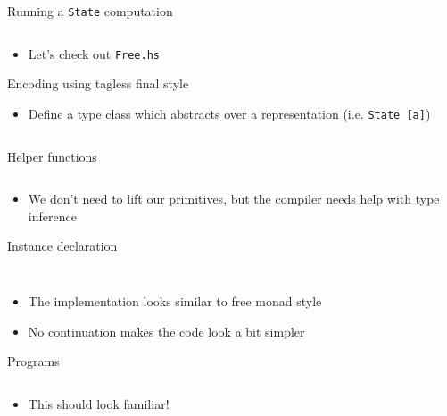 \documentclass[hyperref={pdfpagelabels=false},12pt]{beamer}
\newcommand{\code}[2]{\texttt{#2}}
\newcommand{\haskell}[1]{\code{haskell}{#1}}
\newcommand{\bash}[1]{\code{bash}{#1}}
\newcommand{\pygmentLines}[5]{\inputminted[bgcolor=lightgray,linenos,fontsize=#1,firstline=#2,lastline=#3,autogobble]{#4}{#5}}
\begin{document}
\begin{frame}{Running a \haskell{State} computation}
  \pygmentLines{\normalsize}{58}{62}{haskell}{code/Free.hs}
  \begin{itemize}
    \item Let's check out \bash{Free.hs}
  \end{itemize}
\end{frame}

\begin{frame}{Encoding using tagless final style}
  \begin{itemize}
    \item Define a type class which abstracts over a representation (i.e. \haskell{State [a]})
  \end{itemize}
  \pygmentLines{\normalsize}{14}{17}{haskell}{code/TaglessFinal.hs}
\end{frame}

\begin{frame}{Helper functions}
  \pygmentLines{\normalsize}{26}{33}{haskell}{code/TaglessFinal.hs}
  \begin{itemize}
    \item We don't need to lift our primitives, but the compiler needs help
      with type inference
  \end{itemize}
\end{frame}

\begin{frame}{Instance declaration}
  \pygmentLines{\normalsize}{12}{12}{haskell}{code/TaglessFinal.hs}
  \vspace{-1cm}
  \pygmentLines{\normalsize}{19}{24}{haskell}{code/TaglessFinal.hs}
  \vspace{-0.5cm}
  \begin{itemize}
    \item The implementation looks similar to free monad style
    \item No continuation makes the code look a bit simpler
  \end{itemize}
\end{frame}

\begin{frame}{Programs}
  \pygmentLines{\scriptsize}{35}{49}{haskell}{code/TaglessFinal.hs}
  \vspace{-0.5cm}
  \begin{itemize}
    \item This should look familiar!
  \end{itemize}
\end{frame}
\end{document}
